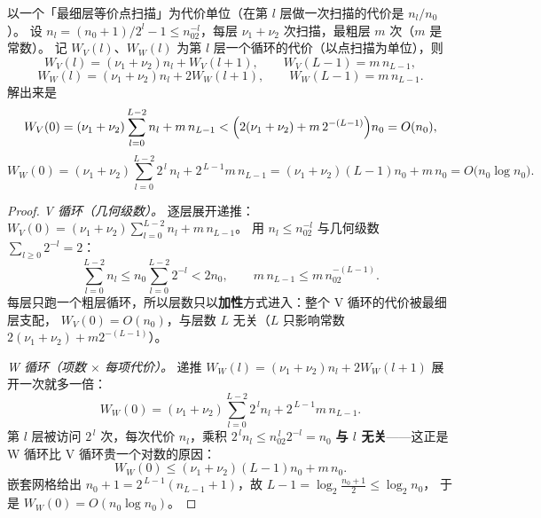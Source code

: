\begin{theorem}[V 循环 $O(n_0)$、W 循环 $O(n_0\log n_0)$]
\label{thm:mg-cost}
以一个「最细层等价点扫描」为代价单位（在第 $l$ 层做一次扫描的代价是 $n_l/n_0$）。
设 $n_l=(n_0+1)/2^l-1\le n_02^{-l}$，每层 $\nu_1+\nu_2$ 次扫描，最粗层 $m$ 次（$m$ 是常数）。
记 $W_V(l)$、$W_W(l)$ 为第 $l$ 层一个循环的代价（以点扫描为单位），则
\begin{equation}
  W_V(l)=(\nu_1+\nu_2)n_l+W_V(l+1),\qquad W_V(L-1)=m\,n_{L-1},
\end{equation}
\begin{equation}
  W_W(l)=(\nu_1+\nu_2)n_l+2W_W(l+1),\qquad W_W(L-1)=m\,n_{L-1}.
\end{equation}
解出来是
\begin{equation}
  W_V(0)=(\nu_1+\nu_2)\sum_{l=0}^{L-2}n_l+m\,n_{L-1}
  <\Bigl(2(\nu_1+\nu_2)+m\,2^{-(L-1)}\Bigr)n_0=O(n_0),
  \label{eq:mg-cost-v}
\end{equation}
\begin{equation}
  W_W(0)=(\nu_1+\nu_2)\sum_{l=0}^{L-2}2^{\,l}\,n_l+2^{\,L-1}m\,n_{L-1}
  =(\nu_1+\nu_2)(L-1)n_0+m\,n_0=O\bigl(n_0\log n_0\bigr).
  \label{eq:mg-cost-w}
\end{equation}
\end{theorem}

\begin{proof}
\emph{V 循环（几何级数）。}
逐层展开递推：$W_V(0)=(\nu_1+\nu_2)\sum_{l=0}^{L-2}n_l+m\,n_{L-1}$。
用 $n_l\le n_02^{-l}$ 与几何级数 $\sum_{l\ge0}2^{-l}=2$：
\begin{equation}
  \sum_{l=0}^{L-2}n_l\le n_0\sum_{l=0}^{L-2}2^{-l}<2n_0,
  \qquad
  m\,n_{L-1}\le m\,n_02^{-(L-1)} .
\end{equation}
每层只跑一个粗层循环，所以层数只以\textbf{加性}方式进入：整个 V 循环的代价被最细层支配，
$W_V(0)=O(n_0)$，与层数 $L$ 无关（$L$ 只影响常数 $2(\nu_1+\nu_2)+m2^{-(L-1)}$）。

\emph{W 循环（项数 $\times$ 每项代价）。}
递推 $W_W(l)=(\nu_1+\nu_2)n_l+2W_W(l+1)$ 展开一次就多一倍：
\begin{equation}
  W_W(0)=(\nu_1+\nu_2)\sum_{l=0}^{L-2}2^{\,l}n_l+2^{\,L-1}m\,n_{L-1}.
\end{equation}
第 $l$ 层被访问 $2^{\,l}$ 次，每次代价 $n_l$，乘积 $2^{\,l}n_l\le n_02^{\,l}2^{-l}=n_0$
\textbf{与 $l$ 无关}——这正是 W 循环比 V 循环贵一个对数的原因：
\begin{equation}
  W_W(0)\le(\nu_1+\nu_2)(L-1)n_0+m\,n_0 .
\end{equation}
嵌套网格给出 $n_0+1=2^{\,L-1}(n_{L-1}+1)$，故 $L-1=\log_2\frac{n_0+1}{2}\le\log_2n_0$，
于是 $W_W(0)=O(n_0\log n_0)$。
\end{proof}

